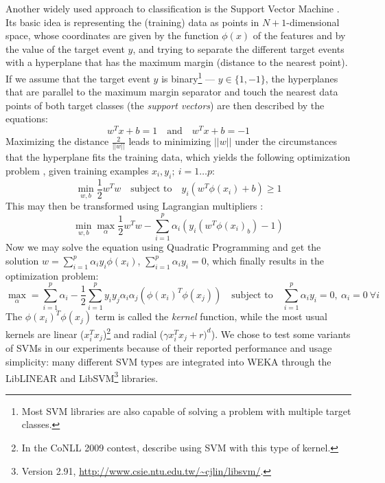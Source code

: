 \documentclass[12pt,notitlepage]{report}
\begin{document}
Another widely used approach to classification is the Support Vector Machine \citep{boser92}. Its basic idea is representing the (training) data as points in $N+1$-dimensional space, whose coordinates are given by the function $\phi(x)$ of the features and by the value of the target event $y$, and trying to separate the different target events with a hyperplane that has the maximum margin (distance to the nearest point). If we assume that the target event $y$ is binary\footnote{Most SVM libraries are also capable of solving a problem with multiple target classes.} --- $y\in \{1,-1\}$, the hyperplanes that are parallel to the maximum margin separator and touch the nearest data points of both target classes (the \emph{support vectors}) are then described by the equations:
\begin{equation}
w^T x + b = 1\quad\mbox{and}\quad w^T x + b = -1
\end{equation}
Maximizing the distance $\frac{2}{||w||}$ leads to minimizing $||w||$ under the circumstances that the hyperplane fits the training data, which yields the following optimization problem \citep{hsu03}, given training examples $x_i,y_i;\ i = 1\dots p$:
\begin{equation}\label{eq:svm-primal}
\min_{w,b} \frac{1}{2}w^T w\quad\mbox{subject to}\quad y_i(w^T\phi(x_i) + b)\geq 1
\end{equation}
This may then be transformed using Lagrangian multipliers \citep{cristianini00}:
\begin{equation}
\min_{w,b} \max_{\alpha} \frac{1}{2}w^T w - \sum_{i=1}^p \alpha_i(y_i(w^T\phi(x_i) _ b) - 1)
\end{equation}
Now we may solve the equation using Quadratic Programming and get the solution $w = \sum_{i=1}^p \alpha_i y_i \phi(x_i)$, $\sum_{i=1}^p \alpha_i y_i = 0$, which finally results in the optimization problem:
\begin{equation}
\max_{\alpha} = \sum_{i=1}^p \alpha_i - \frac{1}{2}\sum_{i=1}^p y_i y_j \alpha_i \alpha_j (\phi(x_i)^T \phi(x_j))\quad\mbox{subject to}\quad \sum_{i=1}^p \alpha_i y_i = 0,\ \alpha_i = 0\ \forall i
\end{equation}
The $\phi(x_i)^T \phi(x_j)$ term is called the \emph{kernel} function, while the most usual kernels are linear ($x_i^T x_j$)\footnote{In the CoNLL 2009 contest, \citet{che09} describe using SVM with this type of kernel.} and radial ($\gamma x_i^T x_j + r)^d$). We chose to test some variants of SVMs in our experiments because of their reported performance and usage simplicity: many different SVM types are integrated into WEKA through the LibLINEAR and LibSVM\footnote{Version 2.91, \url{http://www.csie.ntu.edu.tw/\~cjlin/libsvm/}.} \citep{chang01} libraries.
\end{document}
